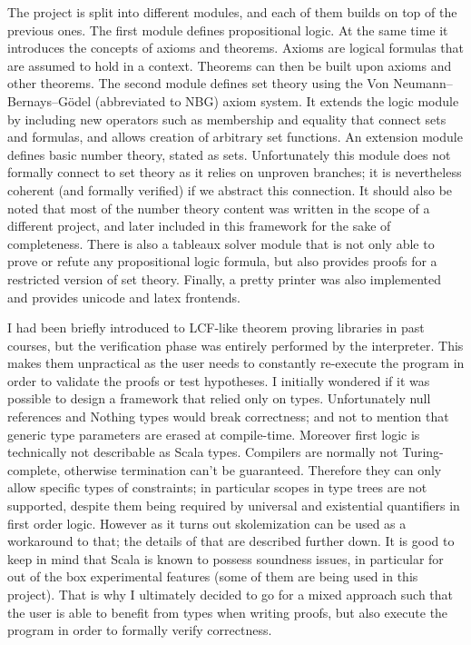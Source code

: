 \documentclass[acmlarge]{acmart}
\begin{document}
The project is split into different modules, and each of them builds on top of the previous ones. The first module defines propositional logic. At the same time it introduces the concepts of axioms and theorems. Axioms are logical formulas that are assumed to hold in a context. Theorems can then be built upon axioms and other theorems. The second module defines set theory using the Von Neumann–Bernays–Gödel (abbreviated to NBG) axiom system. It extends the logic module by including new operators such as membership and equality that connect sets and formulas, and allows creation of arbitrary set functions. An extension module defines basic number theory, stated as sets. Unfortunately this module does not formally connect to set theory as it relies on unproven branches; it is nevertheless coherent (and formally verified) if we abstract this connection. It should also be noted that most of the number theory content was written in the scope of a different project, and later included in this framework for the sake of completeness. There is also a tableaux solver module that is not only able to prove or refute any propositional logic formula, but also provides proofs for a restricted version of set theory. Finally, a pretty printer was also implemented and provides unicode and latex frontends.

I had been briefly introduced to LCF-like theorem proving libraries in past courses, but the verification phase was entirely performed by the interpreter. This makes them unpractical as the user needs to constantly re-execute the program in order to validate the proofs or test hypotheses. I initially wondered if it was possible to design a framework that relied only on types. Unfortunately null references and Nothing types would break correctness; and not to mention that generic type parameters are erased at compile-time. Moreover first logic is technically not describable as Scala types. Compilers are normally not Turing-complete, otherwise termination can't be guaranteed. Therefore they can only allow specific types of constraints; in particular scopes in type trees are not supported, despite them being required by universal and existential quantifiers in first order logic. However as it turns out skolemization can be used as a workaround to that; the details of that are described further down. It is good to keep in mind that Scala is known to possess soundness issues, in particular for out of the box experimental features (some of them are being used in this project). That is why I ultimately decided to go for a mixed approach such that the user is able to benefit from types when writing proofs, but also execute the program in order to formally verify correctness.
\end{document}
